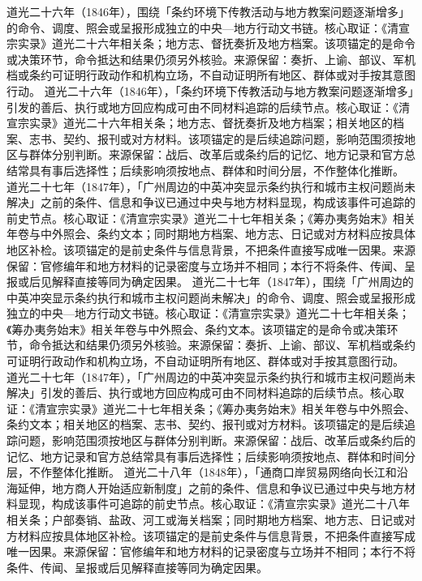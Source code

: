 道光二十六年（1846年），围绕「条约环境下传教活动与地方教案问题逐渐增多」的命令、调度、照会或呈报形成独立的中央—地方行动文书链。核心取证：《清宣宗实录》道光二十六年相关条；地方志、督抚奏折及地方档案。该项锚定的是命令或决策环节，命令抵达和结果仍须另外核验。来源保留：奏折、上谕、部议、军机档或条约可证明行政动作和机构立场，不自动证明所有地区、群体或对手按其意图行动。
道光二十六年（1846年），「条约环境下传教活动与地方教案问题逐渐增多」引发的善后、执行或地方回应构成可由不同材料追踪的后续节点。核心取证：《清宣宗实录》道光二十六年相关条；地方志、督抚奏折及地方档案；相关地区的档案、志书、契约、报刊或对方材料。该项锚定的是后续追踪问题，影响范围须按地区与群体分别判断。来源保留：战后、改革后或条约后的记忆、地方记录和官方总结常具有事后选择性；后续影响须按地点、群体和时间分层，不作整体化推断。
道光二十七年（1847年），「广州周边的中英冲突显示条约执行和城市主权问题尚未解决」之前的条件、信息和争议已通过中央与地方材料显现，构成该事件可追踪的前史节点。核心取证：《清宣宗实录》道光二十七年相关条；《筹办夷务始末》相关年卷与中外照会、条约文本；同时期地方档案、地方志、日记或对方材料应按具体地区补检。该项锚定的是前史条件与信息背景，不把条件直接写成唯一因果。来源保留：官修编年和地方材料的记录密度与立场并不相同；本行不将条件、传闻、呈报或后见解释直接等同为确定因果。
道光二十七年（1847年），围绕「广州周边的中英冲突显示条约执行和城市主权问题尚未解决」的命令、调度、照会或呈报形成独立的中央—地方行动文书链。核心取证：《清宣宗实录》道光二十七年相关条；《筹办夷务始末》相关年卷与中外照会、条约文本。该项锚定的是命令或决策环节，命令抵达和结果仍须另外核验。来源保留：奏折、上谕、部议、军机档或条约可证明行政动作和机构立场，不自动证明所有地区、群体或对手按其意图行动。
道光二十七年（1847年），「广州周边的中英冲突显示条约执行和城市主权问题尚未解决」引发的善后、执行或地方回应构成可由不同材料追踪的后续节点。核心取证：《清宣宗实录》道光二十七年相关条；《筹办夷务始末》相关年卷与中外照会、条约文本；相关地区的档案、志书、契约、报刊或对方材料。该项锚定的是后续追踪问题，影响范围须按地区与群体分别判断。来源保留：战后、改革后或条约后的记忆、地方记录和官方总结常具有事后选择性；后续影响须按地点、群体和时间分层，不作整体化推断。
道光二十八年（1848年），「通商口岸贸易网络向长江和沿海延伸，地方商人开始适应新制度」之前的条件、信息和争议已通过中央与地方材料显现，构成该事件可追踪的前史节点。核心取证：《清宣宗实录》道光二十八年相关条；户部奏销、盐政、河工或海关档案；同时期地方档案、地方志、日记或对方材料应按具体地区补检。该项锚定的是前史条件与信息背景，不把条件直接写成唯一因果。来源保留：官修编年和地方材料的记录密度与立场并不相同；本行不将条件、传闻、呈报或后见解释直接等同为确定因果。
